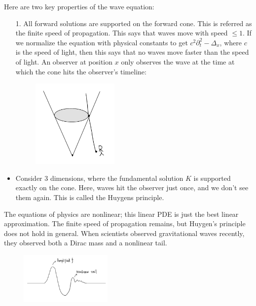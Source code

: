 Here are two key properties of the wave equation: 
\begin{itemize}
    \item [1.] All forward solutions are supported on the forward cone. This is referred as the finite speed of propagation. This says that waves move with speed $\leq 1$. If we normalize the equation with physical constants to get $c^{2} \partial_{t}^{2}-\Delta_{x}$, where $c$ is the speed of light, then this says that no waves move faster than the speed of light. An observer at position $x$ only observes the wave at the time at which the cone hits the observer's timeline:
    \begin{figure}[H]
        \centering
        \includegraphics[width=0.4\textwidth]{pics/20-4.png}
    \end{figure}
    \item Consider 3 dimensions, where the fundamental solution $K$ is supported exactly on the cone. Here, waves hit the observer just once, and we don't see them again. This is called the Huygens principle.
\end{itemize}

\begin{remark}
    The equations of physics are nonlinear; this linear PDE is just the best linear approximation. The finite speed of propagation remains, but Huygen’s principle does not hold in general. When scientists observed gravitational waves recently, they observed both a Dirac mass and a nonlinear tail.

    \begin{figure}[H]
        \centering
        \includegraphics[width=0.4\textwidth]{pics/20-5.png}
    \end{figure}
\end{remark}


